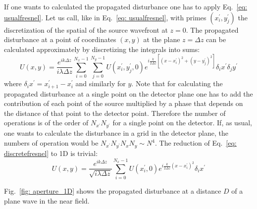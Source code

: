 \documentclass{iucr}              %
\begin{document}
If one wants to calculated the propagated disturbance one has to apply Eq.~\ref{eq: usualfresnel}. Let us call, like in Eq.~\ref{eq: usualfresnel}, with primes $(x^\prime_i,y^\prime_j)$ the discretization of the spatial of the source wavefront at $z=0$. The propagated disturbance at a point of coordinates $(x,y)$ at the plane $z=\Delta z$ can be calculated approximately by discretizing the integrals into sums: 
\begin{equation}\label{eq: discretefresnel}
 U(x,y) = \frac {e^{ik\Delta z }}{ i \lambda \Delta z} \sum_{i=0}^{N_x-1}  \sum_{j=0}^{N_y-1} U(x^\prime_i, y^\prime_j, 0) e^{i \frac{k}{2 \Delta z} [(x - x_i^\prime)^2 + (y - y_j^\prime)^2]} \delta_i x^\prime \delta_j y^\prime
\end{equation}
where $\delta_i x^\prime = x^\prime_{i+1} - x^\prime_i$ and similarly for $y$. Note that for calculating the propagated disturbance at a single point on the detector plane one has to add the contribution of each point of the source multiplied by a phase that depends on the distance of that point to the detector point. Therefore the number of operations is of the order of $N_{x^\prime}  N_{y^\prime}$ for a single point on the detector. If, as usual, one wants to calculate the disturbance in a grid in the detector plane, the numbers of operation would be $N_{x^\prime}  N_{y^\prime} N_{x}  N_{y} \sim N^4$. 
The reduction of Eq.~\ref{eq: discretefresnel} to 1D is trivial:
\begin{equation}\label{eq: discretefresnel1D}
 U(x,y) = \frac {e^{ik\Delta z }}{ \sqrt{i \lambda \Delta z}} \sum_{i=0}^{N_x-1}  U(x^\prime_i, 0) e^{i \frac{k}{2 \Delta z} (x - x_i^\prime)^2 } \delta_i x^\prime
\end{equation}


Fig.~\ref{fig: aperture_1D} shows the propagated disturbance at a distance $D$ of a plane wave in the near field.
\end{document}
